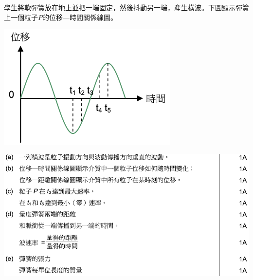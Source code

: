 {
    學生將軟彈簧放在地上並把一端固定，然後抖動另一端，產生橫波。下圖顯示彈簧上一個粒子$P$的位移—時間關係線圖。
    \par{\par\centering\includegraphics[width=.4\textwidth]{./img/ch1_earlyclass_wave_lq_2024-05-13-13-08-15.png}\par}
    \clearpage{}

}{
    \sol\par{\par\centering\includegraphics[width=\textwidth]{./img/ch1_earlyclass_wave_lq_2024-05-13-13-10-00.png}\par}
}

